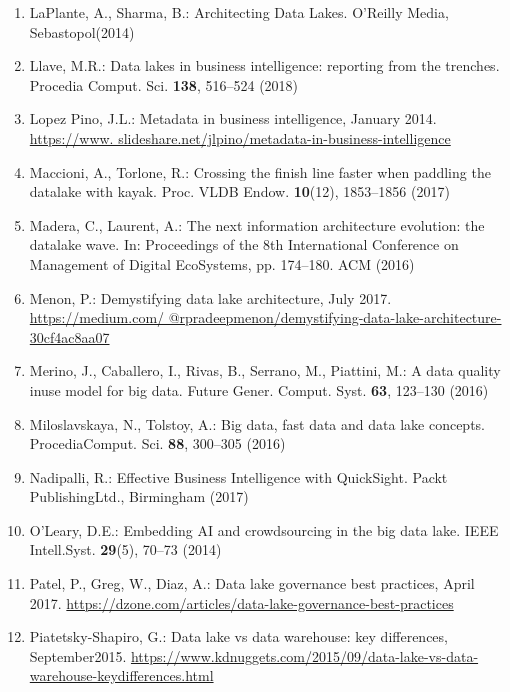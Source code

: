 \documentclass[a4paper,12pt,notitlepage,twoside,openright]{article}
\begin{document}
\begin{enumerate}
\def\labelenumi{\arabic{enumi}.}
\setcounter{enumi}{13}
\item
  LaPlante, A., Sharma, B.: Architecting Data Lakes. O'Reilly Media,
  Sebastopol(2014)
\item
  Llave, M.R.: Data lakes in business intelligence: reporting from the
  trenches. Procedia Comput. Sci. \textbf{138}, 516--524 (2018)
\item
  Lopez Pino, J.L.: Metadata in business intelligence, January 2014.
  \href{https://www.slideshare.net/jlpino/metadata-in-business-intelligence}{https://www.
  slideshare.net/jlpino/metadata-in-business-intelligence}
\item
  Maccioni, A., Torlone, R.: Crossing the finish line faster when
  paddling the datalake with kayak. Proc. VLDB Endow. \textbf{10}(12),
  1853--1856 (2017)
\item
  Madera, C., Laurent, A.: The next information architecture evolution:
  the datalake wave. In: Proceedings of the 8th International Conference
  on Management of Digital EcoSystems, pp. 174--180. ACM (2016)
\item
  Menon, P.: Demystifying data lake architecture, July 2017.
  \href{https://medium.com/@rpradeepmenon/demystifying-data-lake-architecture-30cf4ac8aa07}{https://medium.com/
  @rpradeepmenon/demystifying-data-lake-architecture-30cf4ac8aa07}
\item
  Merino, J., Caballero, I., Rivas, B., Serrano, M., Piattini, M.: A
  data quality inuse model for big data. Future Gener. Comput. Syst.
  \textbf{63}, 123--130 (2016)
\item
  Miloslavskaya, N., Tolstoy, A.: Big data, fast data and data lake
  concepts. ProcediaComput. Sci. \textbf{88}, 300--305 (2016)
\item
  Nadipalli, R.: Effective Business Intelligence with QuickSight. Packt
  PublishingLtd., Birmingham (2017)
\item
  O'Leary, D.E.: Embedding AI and crowdsourcing in the big data lake.
  IEEE Intell.Syst. \textbf{29}(5), 70--73 (2014)
\item
  Patel, P., Greg, W., Diaz, A.: Data lake governance best practices,
  April 2017.
  \url{https://dzone.com/articles/data-lake-governance-best-practices}
\item
  Piatetsky-Shapiro, G.: Data lake vs data warehouse: key differences,
  September2015.
  \href{https://www.kdnuggets.com/2015/09/data-lake-vs-data-warehouse-key-differences.html}{https://www.kdnuggets.com/2015/09/data-lake-vs-data-warehouse-keydifferences.html}

\end{enumerate}
\end{document}

